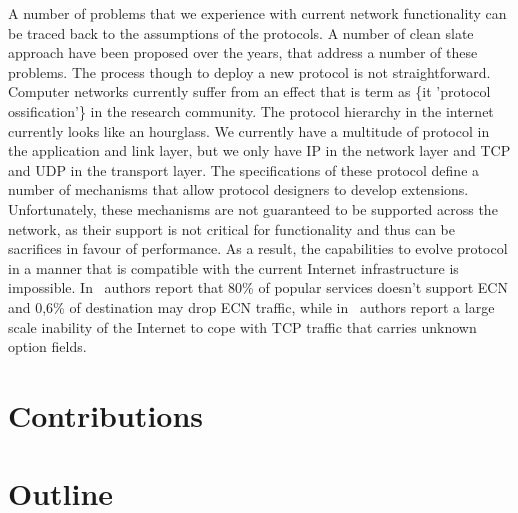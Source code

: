 A number of problems that we experience with current network functionality can
be traced back to the assumptions of the protocols. A number of clean slate
approach have been proposed over the years, that address a number of these
problems. The process though to deploy a new protocol is not straightforward.
Computer networks currently suffer from an effect that is term as \{it 'protocol
  ossification'\} in the research community. The protocol hierarchy in the
internet currently looks like an hourglass. We currently have a multitude of
protocol in the application and link layer, but we only have IP in the network
layer and TCP and UDP in the transport layer. The specifications of these
protocol define a number of mechanisms that allow protocol designers to develop
extensions.  Unfortunately, these mechanisms are not guaranteed to be supported
across the network, as their support is not critical for functionality and thus
can be sacrifices in favour of performance. As a result, the capabilities to
evolve protocol in a manner that is compatible with the current Internet
infrastructure is impossible. In~\cite{Bauer:2011ws} authors report that 80\% of
popular services doesn't support ECN and 0,6\% of destination may drop ECN
traffic, while in~\cite{Honda:2011ci} authors report a large scale inability of
the Internet to cope with TCP traffic that carries unknown option fields. 



\section{Contributions} \label{sec:intro:contributions}

\section{Outline} \label{sec:intro:outline}

